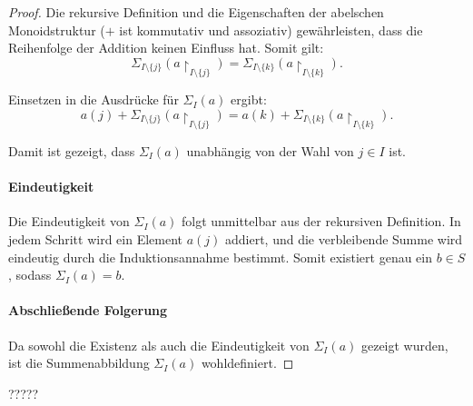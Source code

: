 \documentclass{book}
\theoremstyle{plain}
\theoremstyle{remark}
\theoremstyle{definition}
\begin{document}
\begin{proof}
Die rekursive Definition und die Eigenschaften der abelschen Monoidstruktur (\(+\) ist kommutativ und assoziativ) gewährleisten, dass die Reihenfolge der Addition keinen Einfluss hat. Somit gilt:
\[
\Sigma_{I \setminus \{j\}}(a\restriction_{I \setminus \{j\}}) = \Sigma_{I \setminus \{k\}}(a\restriction_{I \setminus \{k\}}).
\]

Einsetzen in die Ausdrücke für \(\Sigma_I(a)\) ergibt:
\[
a(j) + \Sigma_{I \setminus \{j\}}(a\restriction_{I \setminus \{j\}})
= a(k) + \Sigma_{I \setminus \{k\}}(a\restriction_{I \setminus \{k\}}).
\]

Damit ist gezeigt, dass \(\Sigma_I(a)\) unabhängig von der Wahl von \(j \in I\) ist.

\paragraph{Eindeutigkeit}
Die Eindeutigkeit von \(\Sigma_I(a)\) folgt unmittelbar aus der rekursiven Definition. In jedem Schritt wird ein Element \(a(j)\) addiert, und die verbleibende Summe wird eindeutig durch die Induktionsannahme bestimmt. Somit existiert genau ein \(b \in S\), sodass \(\Sigma_I(a) = b\).

\paragraph{Abschließende Folgerung}
Da sowohl die Existenz als auch die Eindeutigkeit von \(\Sigma_I(a)\) gezeigt wurden, ist die Summenabbildung \(\Sigma_I(a)\) wohldefiniert.
\end{proof}


?????
\end{document}
